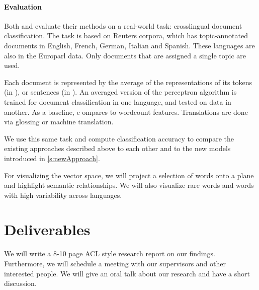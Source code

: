 \documentclass[twocolumn]{article}
\begin{document}

\paragraph{Evaluation}




Both \cite{klementiev2012inducing} and \cite{hermann2013multilingual}
evaluate their methods on a real-world task: crosslingual document classification. The task is based on Reuters corpora, which has topic-annotated documents in English, French, German, Italian and Spanish. These languages are also in the Europarl data. Only documents that are assigned a single topic are used.

Each document is represented by the average of the representations of its tokens (in \cite{klementiev2012inducing}), or sentences (in \cite{hermann2013multilingual}).
An averaged version of the perceptron algorithm is trained for document classification in one language, and tested on data in another.
As a baseline, \cite{klementiev2012inducing} c
ompares to wordcount features. Translations are done via glossing or machine translation.

We use this same task and compute classification accuracy to compare the existing approaches described above to each other and to the new models introduced in \ref{s:newApproach}.



For visualizing the vector space, we will project a selection of words onto a plane and highlight semantic relationships.
We will also visualize rare words and words with high variability across languages.

\section{Deliverables}
We will write a 8-10 page ACL style research report on our findings. Furthermore, we will schedule a meeting with our supervisors and other
interested people. We will give an oral talk about our research and have a short discussion.



\end{document}
